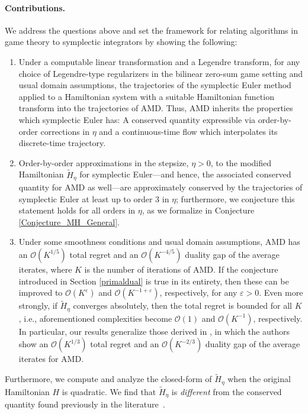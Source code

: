 \documentclass[11pt]{article}
\begin{document}
\paragraph{Contributions.} We address the questions above and set the framework for relating algorithms in game theory to symplectic integrators by showing the following:
\begin{enumerate}
    \item Under a computable linear transformation and a Legendre transform, for any choice of Legendre-type regularizers in the bilinear zero-sum game setting and usual domain assumptions, the trajectories of the symplectic Euler method applied to a Hamiltonian system with a suitable Hamiltonian function transform into the trajectories of AMD. Thus, AMD inherits the properties which symplectic Euler has: A conserved quantity expressible via order-by-order corrections in $\eta$ and a continuous-time flow which interpolates its discrete-time trajectory.
    \item Order-by-order approximations in the stepsize, $\eta>0$, to the modified Hamiltonian $\widetilde{H}_{\eta}$ for symplectic Euler---and hence, the associated conserved quantity for AMD as well---are approximately conserved by the trajectories of symplectic Euler at least up to order $3$ in $\eta$; furthermore, we conjecture this statement holds for all orders in $\eta$, as we formalize in Conjecture \ref{Conjecture_MH_General}.
    \item Under some smoothness conditions and usual domain assumptions, AMD has an $\mathcal{O}(K^{1/5})$ total regret and an $\mathcal{O}(K^{-4/5})$ duality gap of the average iterates, where $K$ is the number of iterations of AMD. If the conjecture introduced in Section \ref{primaldual} is true in its entirety, then these can be improved to $\mathcal{O}\left(K^{\varepsilon}\right)$ and $\mathcal{O}\left(K^{-1+\varepsilon}\right)$, respectively, for any $\varepsilon>0$. 
    Even more strongly, if $\widetilde{H}_{\eta}$ converges absolutely, then the total regret is bounded for all $K$, i.e., aforementioned complexities become $\mathcal{O}\left(1\right)$ and $\mathcal{O}\left(K^{-1}\right)$, respectively. In particular, our results generalize those derived in \cite{Wibisono2022}, in which the authors show an $\mathcal{O}(K^{1/3})$ total regret and an $\mathcal{O}(K^{-2/3})$ duality gap of the average iterates for AMD.
\end{enumerate}
Furthermore, we compute and analyze the closed-form of $\widetilde{H}_{\eta}$ when the original Hamiltonian $H$ is quadratic. We find that $\widetilde{H}_{\eta}$ is \textit{different} from the conserved quantity found previously in the literature~\citep[e.g.,][]{pmlr-v125-bailey20a}.
\end{document}
